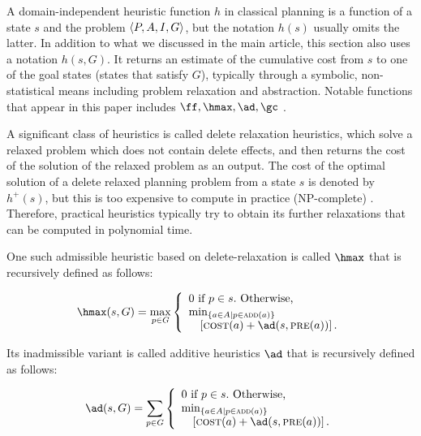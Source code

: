 
A domain-independent heuristic function $h$ in classical planning is
a function of a state $s$ and the problem ${\left<P,A,I,G\right>}$,
but the notation $h(s)$ usually omits the latter.
In addition to what we discussed in the main article, this section also uses a notation $h(s,G)$.
It returns an estimate of the cumulative cost from $s$ to one of the goal states (states that satisfy $G$),
typically through a symbolic, non-statistical means including problem relaxation and abstraction.
Notable \lsota functions that appear in this paper includes
$\ff, \hmax, \ad, \gc$ \cite{hoffmann01,bonet2001planning,FikesHN72}.

A significant class of heuristics is called delete relaxation heuristics,
which solve a relaxed problem which does not contain delete effects,
and then returns the cost of the solution of the relaxed problem as an output.
The cost of the optimal solution of a delete relaxed planning problem from a state $s$ is
denoted by $h^+(s)$, but this is too expensive to compute in practice (NP-complete) \cite{bylander1996}.
Therefore, practical heuristics typically try to obtain its further relaxations
that can be computed in polynomial time.

One such admissible heuristic based on delete-relaxation is called
$\hmax$ \cite{bonet2001planning} that is recursively defined as follows:

\begin{align}
 \hmax(s,G) = \max_{p\in G}
 \left\{
  \begin{array}{l}
   0\ \text{if}\ p\in s.\ \text{Otherwise,}\\
   \min_{\braces{a\in A\mid p\in\adde(a)}} \\
    \quad \left[\cost(a)+\ad(s, \pre(a))\right].
  \end{array}
 \right.
\end{align}

Its inadmissible variant is called
additive heuristics $\ad$ \cite{bonet2001planning} that is recursively defined as follows:

\begin{align}
 \ad(s,G) = \sum_{p\in G}
 \left\{
  \begin{array}{l}
   0\ \text{if}\ p\in s.\ \text{Otherwise,}\\
   \min_{\braces{a\in A\mid p\in\adde(a)}} \\
    \quad \left[\cost(a)+\ad(s, \pre(a))\right].
  \end{array}
 \right.
\end{align}

